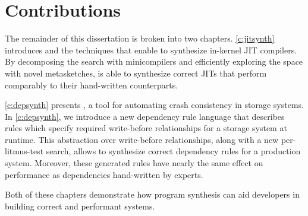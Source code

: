 \section{Contributions}
The remainder of this dissertation is broken into two chapters.
\cref{c:jitsynth} introduces \jitsynth and the techniques that enable
\jitsynth to synthesize in-kernel JIT compilers.
By decomposing the search with minicompilers
and efficiently exploring the space with novel metasketches,
\jitsynth is able to synthesize correct JITs that perform
comparably to their hand-written counterparts.

\cref{c:depsynth} presents \depsynth, a tool for automating
crash consistency in storage systems. In \cref{c:depsynth},
we introduce a new dependency rule language that describes rules
which specify required write-before relationships for a storage system
at runtime. This abstraction over write-before relationships, along
with a new per-litmus-test search, allows \depsynth to synthesize
correct dependency rules for a production system.
Moreover, these generated rules have nearly the same effect on performance
as dependencies hand-written by experts.

Both of these chapters demonstrate
how program synthesis can aid developers in building
correct and performant systems.

